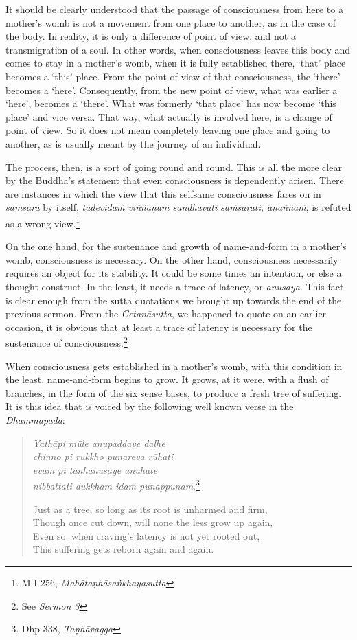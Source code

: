 It should be clearly understood that the passage of consciousness from here to a mother's womb is not a movement from one place to another, as in the case of the body. In reality, it is only a difference of point of view, and not a transmigration of a soul. In other words, when consciousness leaves this body and comes to stay in a mother's womb, when it is fully established there, `that' place becomes a `this' place. From the point of view of that consciousness, the `there' becomes a `here'. Consequently, from the new point of view, what was earlier a `here', becomes a `there'. What was formerly `that place' has now become `this place' and vice versa. That way, what actually is involved here, is a change of point of view. So it does not mean completely leaving one place and going to another, as is usually meant by the journey of an individual.

The process, then, is a sort of going round and round. This is all the more clear by the Buddha's statement that even consciousness is dependently arisen. There are instances in which the view that this selfsame consciousness fares on in \emph{saṁsāra} by itself, \emph{tadevidaṁ viññāṇaṁ sandhāvati saṁsarati, anaññaṁ}, is refuted as a wrong view.\footnote{M I 256, \emph{Mahātaṇhāsaṅkhayasutta}}

On the one hand, for the sustenance and growth of name-and-form in a mother's womb, consciousness is necessary. On the other hand, consciousness necessarily requires an object for its stability. It could be some times an intention, or else a thought construct. In the least, it needs a trace of latency, or \emph{anusaya}. This fact is clear enough from the sutta quotations we brought up towards the end of the previous sermon. From the \emph{Cetanāsutta}, we happened to quote on an earlier occasion, it is obvious that at least a trace of latency is necessary for the sustenance of consciousness.\footnote{See \emph{Sermon 3}}

When consciousness gets established in a mother's womb, with this condition in the least, name-and-form begins to grow. It grows, at it were, with a flush of branches, in the form of the six sense bases, to produce a fresh tree of suffering. It is this idea that is voiced by the following well known verse in the \emph{Dhammapada}:

\begin{quote}
\emph{Yathāpi mūle anupaddave daḷhe}\\
\emph{chinno pi rukkho punareva rūhati}\\
\emph{evam pi taṇhānusaye anūhate}\\
\emph{nibbattati dukkham idaṁ punappunaṁ}.\footnote{Dhp 338, \emph{Taṇhāvagga}}

Just as a tree, so long as its root is unharmed and firm,\\
Though once cut down, will none the less grow up again,\\
Even so, when craving's latency is not yet rooted out,\\
This suffering gets reborn again and again.
\end{quote}

